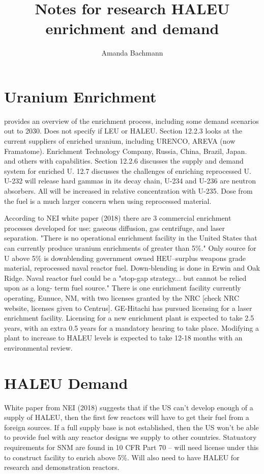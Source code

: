 \documentclass{article}
\begin{document}
\title{Notes for research HALEU enrichment and demand}
\author{Amanda Bachmann}
\maketitle

\section{Uranium Enrichment}
\cite{harding_12_2016} provides an overview of the enrichment process, 
including some demand scenarios out to 2030. Does not specify if 
LEU or HALEU. Section 12.2.3 looks at the current suppliers of enriched 
uranium, including URENCO, AREVA (now Framatome). Enrichment Technology 
Company, Russia, China, Brazil, Japan. and others with capabilities. 
Section 12.2.6 discusses the supply and demand system for enriched U. 
12.7 discusses the challenges of enriching reprocessed U. U-232 will 
release hard gammas in its decay chain, U-234 and U-236 are neutron 
absorbers. All will be increased in relative concentration with U-235. 
Dose from the fuel is a much larger concern when using reprocessed 
material. 

According to NEI white paper (2018) there are 3 commercial enrichment 
processes developed for use: gaseous diffusion, gas centrifuge, and laser 
separation. "There is no operational enrichment facility in the 
United States that can currently produce uranium enrichments of greater
than 5\%." Only source for U above 5\% is downblending government 
owned HEU--surplus weapons grade material, reprocessed naval reactor
fuel. Down-blending is done in Erwin and Oak Ridge. Naval reactor fuel 
could be a "stop-gap strategy... but cannot be relied upon as a long-
term fuel source." There is one enrichment facility currently 
operating, Eunuce, NM, with two licenses granted by the NRC [check 
NRC website, licenses given to Centrus]. GE-Hitachi has pursued 
licensing for a laser enrichment facility. Licensing for a new 
enrichment plant is expected to take 2.5 years, with an extra 0.5 
years for a mandatory hearing to take place. Modifying a plant to 
increase to HALEU levels is expected to take 12-18 months with an 
environmental review. 

\section{HALEU Demand}
White paper from NEI (2018) suggests that if the US can't develop 
enough of a supply of HALEU, then the first few reactors will have 
to get their fuel from a foreign sources. If a full supply base 
is not established, then the US won't be able to provide fuel 
with any reactor designs we supply to other countries. Statuatory
requirements for SNM are found in 10 CFR Part 70 -- will need license 
under this to construct facility to enrich above 5\%. Will also need 
to have HALEU for research and demonstration reactors. 
\end{document}
